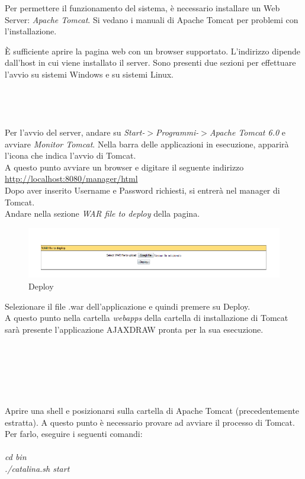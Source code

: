 Per permettere il funzionamento del sistema, \`e necessario installare un Web Server: \textit{Apache Tomcat}. 
Si vedano i manuali di Apache Tomcat per problemi con l'installazione.


\`E sufficiente aprire la pagina web con un browser supportato. L'indirizzo dipende dall'host in cui viene installato il server.
Sono presenti due sezioni per effettuare l'avvio su sistemi Windows e su sistemi Linux.\\
\\\\
\\
\\
Per l'avvio del server, andare su \textit{Start-$ > $Programmi-$ > $Apache Tomcat 6.0} e avviare \textit{Monitor Tomcat}.
Nella barra delle applicazioni in esecuzione, apparir\`a l'icona che indica l'avvio di Tomcat.\\
A questo punto avviare un browser e digitare il seguente indirizzo\\ \href{http://localhost:8080/manager/html}{http://localhost:8080/manager/html}\\
Dopo aver inserito Username e Password richiesti, si entrer\`a nel manager di Tomcat.\\
Andare nella sezione \textit{WAR file to deploy} della pagina.\\

\begin{figure}[!ht]
\centering
\includegraphics[scale=0.7]{images/DeployTomcat.png}
\caption{Deploy}
\end{figure} 

Selezionare il file .war dell'applicazione e quindi premere su Deploy.\\
A questo punto nella cartella \textit{webapps} della cartella di installazione di Tomcat sar\`a presente l'applicazione AJAXDRAW pronta per la sua esecuzione.\\
\\\\
\\\\
\\
\\
Aprire una shell e posizionarsi sulla cartella di Apache Tomcat (precedentemente estratta).
A questo punto \`e necessario provare ad avviare il processo di Tomcat. Per farlo, eseguire i seguenti comandi:\\
\\
\textit{cd bin}\\
\textit{./catalina.sh start}\\

